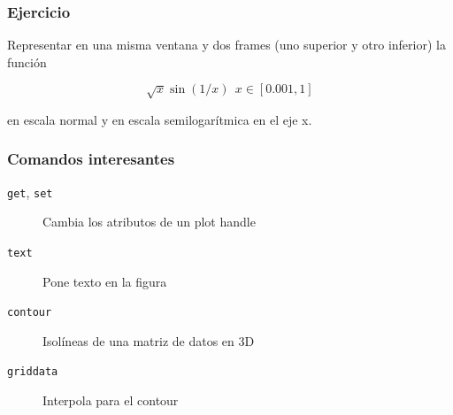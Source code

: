 \documentclass[12pt]{beamer}
\begin{document}
\begin{frame}
\frametitle{Ejercicio}

Representar en una misma ventana y dos frames (uno superior y otro
inferior) la función

\[ \sqrt{x} \sin(1/x)\ \ x \in[0.001,1]  \]

en escala normal y en escala semilogarítmica en el eje x.
\end{frame}

\begin{frame}
\frametitle{Comandos interesantes}
\begin{description}
\item[\texttt{get}, \texttt{set}] Cambia los atributos de un plot
  handle
\item[\texttt{text}] Pone texto en la figura
\item[\texttt{contour}] Isolíneas de una matriz de datos en 3D
\item[\texttt{griddata}] Interpola para el contour
\end{description}
\end{frame}
\end{document}
